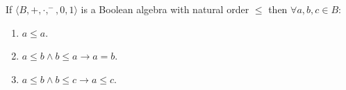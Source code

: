 If $\langle B, +, \cdot, ^-, 0, 1 \rangle$ is a Boolean algebra with natural order $\leq$ then $\forall a, b, c \in B$:
\begin{enumerate}
\item $a \leq a$.
\item $a \leq b \land b \leq a \rightarrow a = b$.
\item $a \leq b \land b \leq c \rightarrow a \leq c$.
\end{enumerate}
